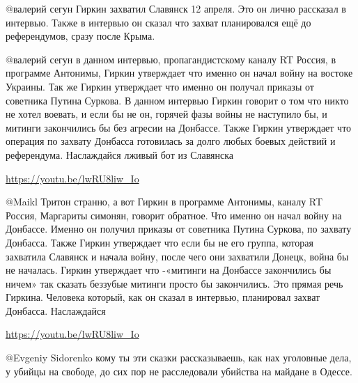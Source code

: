 \begin{multicols}{2}
\begin{itemize}

@валерий сегун  Гиркин захватил Славянск 12 апреля. Это он лично рассказал в
интервью. Также в интервью он сказал что захват планировался ещё до
референдумов, сразу после Крыма. 


@валерий сегун  в данном интервью, пропагандистскому каналу RT Россия, в
программе Антонимы, Гиркин утверждает что именно он начал войну на востоке
Украины. Так же Гиркин утверждает что именно он получал приказы от советника
Путина Суркова. В данном интервью Гиркин говорит о том что никто не хотел
воевать, и если бы не он, горячей фазы войны не наступило бы, и митинги
закончились бы без агресии на Донбассе. Также Гиркин утверждает что операция
по захвату Донбасса готовилась за долго любых боевых действий и референдума.
Наслаждайся лживый бот из Славянска

\url{https://youtu.be/lwRU8liw_Io} 


@Maikl Тритон  странно, а вот Гиркин в программе Антонимы, каналу RT Россия,
Маргариты симонян, говорит обратное. Что именно он начал войну на Донбассе.
Именно он получил приказы от советника Путина Суркова, по захвату Донбасса.
Также Гиркин утверждает что если бы не его группа, которая захватила Славянск
и начала войну, после чего они захватили Донецк, война бы не началась. Гиркин
утверждает что -«митинги на Донбассе закончились бы ничем» так сказать
беззубые митинги просто бы закончились. Это прямая речь Гиркина. Человека
который, как он сказал в интервью, планировал захват Донбасса. Наслаждайся 

\url{https://youtu.be/lwRU8liw_Io} 


@Evgeniy Sidorenko  кому ты эти сказки рассказываешь, как нах уголовные дела,
у убийцы на свободе, до сих пор не расследовали убийства на майдане в Одессе.



\end{itemize}
\end{multicols}
